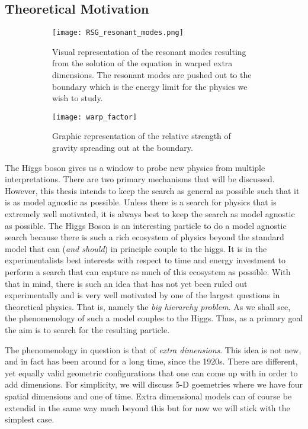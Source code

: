 \documentclass[12pt]{article}
\begin{document}
\subsection{Theoretical Motivation}
\begin{figure}[t]
    \centering
    \begin{subfigure}[t]{.48\textwidth}
        \centering
        \texttt{[image: RSG\_resonant\_modes.png]}
        \caption{
        Visual representation of the resonant modes resulting from the solution
        of the equation in warped extra dimensions. The resonant modes are
        pushed out to the boundary which is the energy limit for the physics we
        wish to study.
        }
        \label{subfig:RSG_resonant_modes}
    \end{subfigure}
    \hfill
    \begin{subfigure}[t]{.48\textwidth}
        \centering
        \texttt{[image: warp\_factor]}
        \caption{Graphic representation of the relative strength of gravity
        spreading out at the boundary.}
        \label{subfig:warp_factor}
    \end{subfigure}
\caption{}
\label{fig:theoretical_motivation_figure}
\end{figure}
The Higgs boson gives us a window to probe new physics from multiple
interpretations. There are two primary mechanisms that will be discussed.
However, this thesis intends to keep the search as general as possible such that
it is as model agnostic as possible. Unless there is a search for physics that
is extremely well motivated, it is always best to keep the search as model
agnostic as possible. The Higgs Boson is an interesting particle to do a model
agnostic search because there is such a rich ecosystem of physics beyond the
standard model that can (\textit{and should}) in principle couple to the higgs.
It is in the experimentalists best interests with respect to time and energy
investment to perform a search that can capture as much of this ecosystem as
possible. With that in mind, there is such an idea that has not yet been ruled
out experimentally and is very well motivated by one of the largest questions in
theoretical physics. That is, namely the \textit{big hierarchy problem}. As we
shall see, the phenomenology of such a model couples to the Higgs. Thus, as a
primary goal the aim is to search for the resulting particle.

The phenomenology in question is that of \textit{extra dimensions}. This idea is
not new, and in fact has been around for a long time, since the 1920s. There are
different, yet equally valid geometric configurations that one can come up with
in order to add dimensions. For simplicity, we will discuss 5-D goemetries where
we have four spatial dimensions and one of time. Extra dimensional models can of
course be extendid in the same way much beyond this but for now we will stick
with the simplest case.
\end{document}
